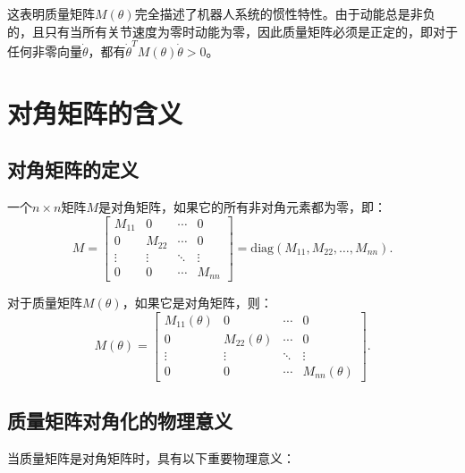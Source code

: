 \documentclass{article}
\begin{document}
这表明质量矩阵$M(\theta)$完全描述了机器人系统的惯性特性。由于动能总是非负的，且只有当所有关节速度为零时动能为零，因此质量矩阵必须是正定的，即对于任何非零向量$\dot{\theta}$，都有$\dot{\theta}^T M(\theta)\dot{\theta} > 0$。

\section{对角矩阵的含义}

\subsection{对角矩阵的定义}

一个$n \times n$矩阵$M$是对角矩阵，如果它的所有非对角元素都为零，即：
\begin{equation}
M = \begin{bmatrix}
M_{11} & 0 & \cdots & 0 \\
0 & M_{22} & \cdots & 0 \\
\vdots & \vdots & \ddots & \vdots \\
0 & 0 & \cdots & M_{nn}
\end{bmatrix} = \text{diag}(M_{11}, M_{22}, \ldots, M_{nn}).
\end{equation}

对于质量矩阵$M(\theta)$，如果它是对角矩阵，则：
\begin{equation}
M(\theta) = \begin{bmatrix}
M_{11}(\theta) & 0 & \cdots & 0 \\
0 & M_{22}(\theta) & \cdots & 0 \\
\vdots & \vdots & \ddots & \vdots \\
0 & 0 & \cdots & M_{nn}(\theta)
\end{bmatrix}.
\end{equation}

\subsection{质量矩阵对角化的物理意义}

当质量矩阵是对角矩阵时，具有以下重要物理意义：
\end{document}
